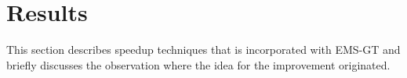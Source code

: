 \section{Results}

This section describes speedup techniques that is incorporated with EMS-GT and briefly discusses the observation where the idea for the improvement originated. 






